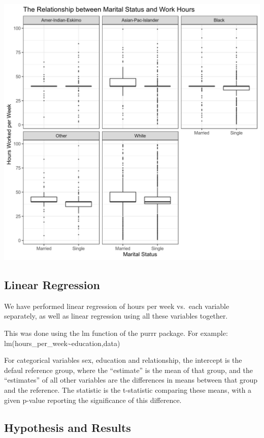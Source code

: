 \documentclass[]{article}
\begin{document}
\includegraphics{../images/Plot_4_Marital_Status_and_Work_Hours.png}

\hypertarget{linear-regression}{%
\subsection{Linear Regression}\label{linear-regression}}

We have performed linear regression of hours per week vs.~each variable
separately, as well as linear regression using all these variables
together.

This was done using the lm function of the purrr package. For example:
lm(hours\_per\_week\textasciitilde{}education,data)

For categorical variables sex, education and relationship, the intercept
is the defaul reference group, where the ``estimate'' is the mean of
that group, and the ``estimates'' of all other variables are the
differences in means between that group and the reference. The statistic
is the t-statistic comparing these means, with a given p-value reporting
the significance of this difference.

\hypertarget{hypothesis-and-results}{%
\subsection{Hypothesis and Results}\label{hypothesis-and-results}}
\end{document}
